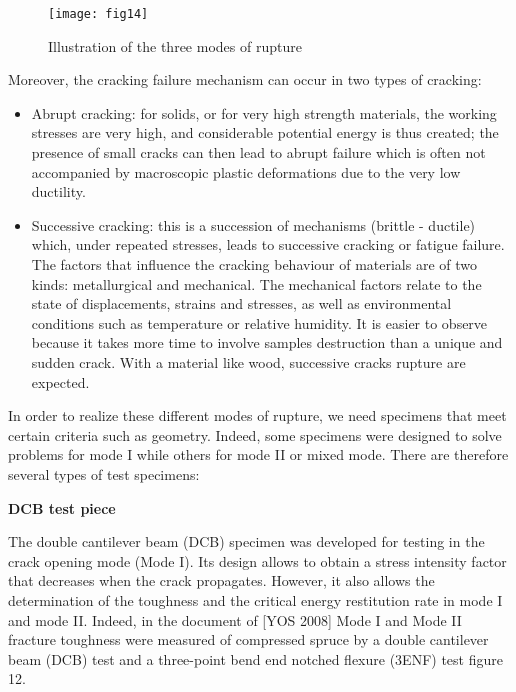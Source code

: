 \graphicspath{{Images/}}
\begin{figure}[htp]
	\centering
	\texttt{[image: fig14]}
	\caption{Illustration of the three modes of rupture}
	\label{fig:galaxy}
\end{figure}

Moreover, the cracking failure mechanism can occur in two types of cracking: 

\begin{itemize}
	\item Abrupt cracking: for solids, or for very high strength materials, the working stresses are very high, and considerable potential energy is thus created; the presence of small cracks can then lead to abrupt failure which is often not accompanied by macroscopic plastic deformations due to the very low ductility. 
	\item Successive cracking: this is a succession of mechanisms (brittle - ductile) which, under repeated stresses, leads to successive cracking or fatigue failure. The factors that influence the cracking behaviour of materials are of two kinds: metallurgical and mechanical. The mechanical factors relate to the state of displacements, strains and stresses, as well as environmental conditions such as temperature or relative humidity. It is easier to observe because it takes more time to involve samples destruction than a unique and sudden crack. With a material like wood, successive cracks rupture are expected.
\end{itemize}

In order to realize these different modes of rupture, we need specimens that meet certain criteria such as geometry. Indeed, some specimens were designed to solve problems for mode I while others for mode II or mixed mode. There are therefore several types of test specimens:

\smallskip

\textbf{DCB test piece}

The double cantilever beam (DCB) specimen was developed for testing in the crack opening mode (Mode I). Its design allows to obtain a stress intensity factor that decreases when the crack propagates. However, it also allows the determination of the toughness and the critical energy restitution rate in mode I and mode II. Indeed, in the document of [YOS 2008] Mode I and Mode II fracture toughness were measured of compressed spruce by a double cantilever beam (DCB) test and a three-point bend end notched flexure (3ENF) test figure 12.


